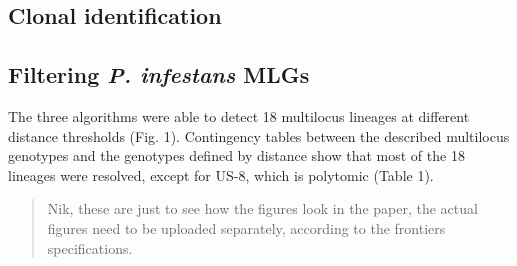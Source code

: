 \documentclass{frontiersSCNS} %
\begin{document}
\subsection*{Clonal identification}\label{clonal-identification}

\subsection*{\texorpdfstring{Filtering \emph{P. infestans}
MLGs}{Filtering P. infestans MLGs}}\label{filtering-p.-infestans-mlgs}

The three algorithms were able to detect 18 multilocus lineages at
different distance thresholds (Fig. 1). Contingency tables between the
described multilocus genotypes and the genotypes defined by distance
show that most of the 18 lineages were resolved, except for US-8, which
is polytomic (Table 1).

\begin{quote}
Nik, these are just to see how the figures look in the paper, the actual
figures need to be uploaded separately, according to the frontiers
specifications.
\end{quote}
\end{document}
